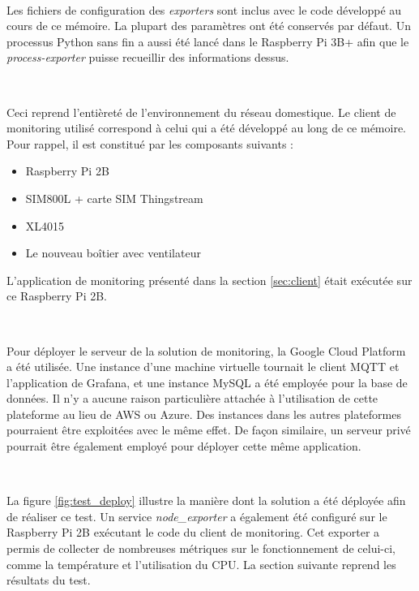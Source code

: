 ~

\noindent
Les fichiers de configuration des \textit{exporters} sont inclus avec le code développé au cours de ce mémoire. La plupart des paramètres ont été conservés par défaut. Un processus Python sans fin a aussi été lancé dans le Raspberry Pi 3B+ afin que le \textit{process-exporter} puisse recueillir des informations dessus.

~

\noindent
Ceci reprend l'entièreté de l'environnement du réseau domestique. Le client de monitoring utilisé correspond à celui qui a été développé au long de ce mémoire. Pour rappel, il est constitué par les composants suivants :


\begin{itemize}
  \item Raspberry Pi 2B
  \item SIM800L + carte SIM Thingstream
  \item XL4015
  \item Le nouveau boîtier avec ventilateur
\end{itemize}
\vspace{0.1cm}
\noindent
L'application de monitoring présenté dans la section \ref{sec:client} était exécutée sur ce Raspberry Pi 2B.

~

\noindent
Pour déployer le serveur de la solution de monitoring, la Google Cloud Platform\cite{google_cloud} a été utilisée. Une instance d'une machine virtuelle tournait le client MQTT et l'application de Grafana, et une instance MySQL a été employée pour la base de données. Il n'y a aucune raison particulière attachée à l'utilisation de cette plateforme au lieu de AWS ou Azure. Des instances dans les autres plateformes pourraient être exploitées avec le même effet. De façon similaire, un serveur privé pourrait être également employé pour déployer cette même application.

~

\noindent
La figure \ref{fig:test_deploy} illustre la manière dont la solution a été déployée afin de réaliser ce test. Un service \textit{node\_exporter} a également été configuré sur le Raspberry Pi 2B exécutant le code du client de monitoring. Cet exporter a permis de collecter de nombreuses métriques sur le fonctionnement de celui-ci, comme la température et l'utilisation du CPU. La section suivante reprend les résultats du test.

